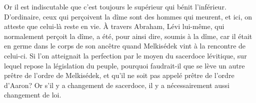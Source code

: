 Or il est indiscutable que c’est toujours le supérieur qui bénit l’inférieur.
D’ordinaire, ceux qui perçoivent la dîme sont des hommes qui meurent,
	et ici, on atteste que celui-là reste en vie.
À travers Abraham,
	Lévi lui-même, qui normalement perçoit la dîme,
	a été, pour ainsi dire, soumis à la dîme,
	car il était en germe dans le corps de son ancêtre
	quand Melkisédek vint à la rencontre de celui-ci.
Si l’on atteignait la perfection par le moyen du sacerdoce lévitique,
	sur lequel repose la législation du peuple,
	pourquoi faudrait-il que se lève un autre prêtre de l’ordre de Melkisédek,
	et qu’il ne soit pas appelé prêtre de l’ordre d’Aaron?
Or s’il y a changement de sacerdoce, il y a nécessairement aussi changement de loi.
